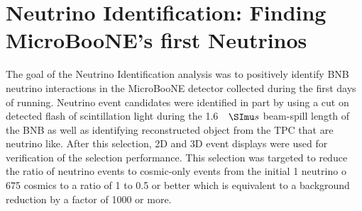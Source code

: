 \chapter{Neutrino Identification: Finding MicroBooNE's first Neutrinos} \label{ch:neutrinoID}
The goal of the Neutrino Identification analysis was to positively identify BNB neutrino interactions in the MicroBooNE detector collected during the first days of running. Neutrino event candidates were identified in part by using a cut on detected flash of scintillation light during the 1.6 $\micro s$ beam-spill length of the BNB as well as identifying reconstructed object from the TPC that are neutrino like. After this selection, 2D and 3D event displays were used for verification of the selection performance. This selection was targeted to reduce the ratio of neutrino events to cosmic-only events from the initial 1 neutrino o 675 cosmics to a ratio of 1 to 0.5 or better which is equivalent to a background reduction by a factor of 1000 or more.    
